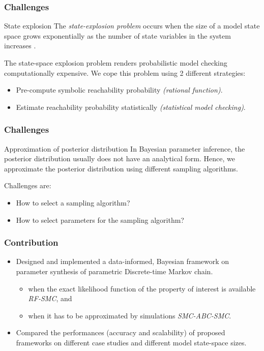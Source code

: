 \documentclass{beamer}
\begin{document}
\begin{frame}
    \frametitle{Challenges}
    \begin{block}{State explosion}
        The \textit{state-explosion problem} occurs when the size of a model state space grows exponentially
        as the number of state variables in the system increases \cite{clarke2011model}.
    \end{block}
    The state-space explosion problem renders probabilistic model checking computationally
    expensive. We cope this problem using 2 different strategies:
    \begin{itemize}
        \item Pre-compute symbolic reachability probability \textit{(rational function)}.
        \item Estimate reachability probability statistically \textit{(statistical model checking)}.
    \end{itemize}
\end{frame}

\begin{frame}
    \frametitle{Challenges}
    \begin{block}{Approximation of posterior distribution}
        In Bayesian parameter inference, the posterior distribution usually does not have an
        analytical form. Hence, we approximate the posterior distribution using different sampling
        algorithms.
    \end{block}
    Challenges are:
    \begin{itemize}
        \item How to select a sampling algorithm?
        \item How to select parameters for the sampling algorithm?
    \end{itemize}
\end{frame}

\begin{frame}
    \frametitle{Contribution}
    \begin{itemize}
        \item<1-> Designed and implemented a data-informed, Bayesian framework on parameter
              synthesis of parametric Discrete-time Markov chain.
              \begin{itemize}
                  \item when the exact likelihood function of the property of interest is available \textit{RF-SMC}, and
                  \item when it has to be approximated by simulations \textit{SMC-ABC-SMC}.
              \end{itemize}
        \item<2-> Compared the performances (accuracy and scalability) of proposed frameworks on
              different case studies and different model state-space sizes.
    \end{itemize}
\end{frame}
\end{document}
